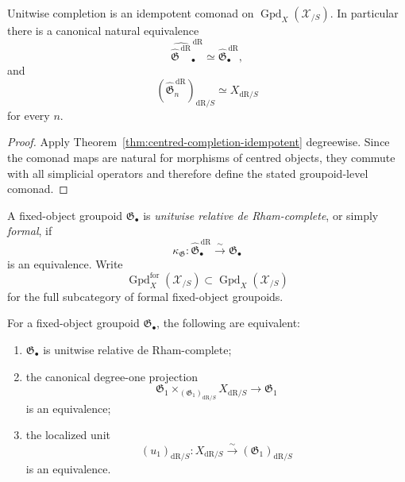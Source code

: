 \begin{theorem}
\label{thm:unitwise-completion-idempotent}
Unitwise completion is an idempotent comonad on
$\operatorname{Gpd}_X(\mathcal X_{/S})$.  In particular there is a canonical
natural equivalence
\[
    \widehat{
        \widehat{\mathfrak G}^{\,\mathrm{dR}}
    }^{\,\mathrm{dR}}_\bullet
    \simeq
    \widehat{\mathfrak G}^{\,\mathrm{dR}}_\bullet,
\]
and
\[
    \left(
        \widehat{\mathfrak G}^{\,\mathrm{dR}}_n
    \right)_{\mathrm{dR}/S}
    \simeq
    X_{\mathrm{dR}/S}
\]
for every $n$.
\end{theorem}

\begin{proof}
Apply Theorem~\ref{thm:centred-completion-idempotent} degreewise.  Since the
comonad maps are natural for morphisms of centred objects, they commute with
all simplicial operators and therefore define the stated groupoid-level
comonad.
\end{proof}

\begin{definition}
\label{def:unitwise-complete-groupoid}
A fixed-object groupoid $\mathfrak G_\bullet$ is
\emph{unitwise relative de Rham-complete}, or simply \emph{formal}, if
\[
    \kappa_{\mathfrak G}:
    \widehat{\mathfrak G}^{\,\mathrm{dR}}_\bullet
    \xrightarrow{\sim}
    \mathfrak G_\bullet
\]
is an equivalence.  Write
\[
    \operatorname{Gpd}^{\mathrm{for}}_X(\mathcal X_{/S})
    \subset
    \operatorname{Gpd}_X(\mathcal X_{/S})
\]
for the full subcategory of formal fixed-object groupoids.
\end{definition}

\begin{proposition}
\label{prop:degree-one-formality}
For a fixed-object groupoid $\mathfrak G_\bullet$, the following are
equivalent:
\begin{enumerate}
    \item $\mathfrak G_\bullet$ is unitwise relative de Rham-complete;
    \item the canonical degree-one projection
    \[
        \mathfrak G_1
        \times_{(\mathfrak G_1)_{\mathrm{dR}/S}}
        X_{\mathrm{dR}/S}
        \longrightarrow
        \mathfrak G_1
    \]
    is an equivalence;
    \item the localized unit
    \[
        (u_1)_{\mathrm{dR}/S}:
        X_{\mathrm{dR}/S}
        \xrightarrow{\sim}
        (\mathfrak G_1)_{\mathrm{dR}/S}
    \]
    is an equivalence.
\end{enumerate}
\end{proposition}

